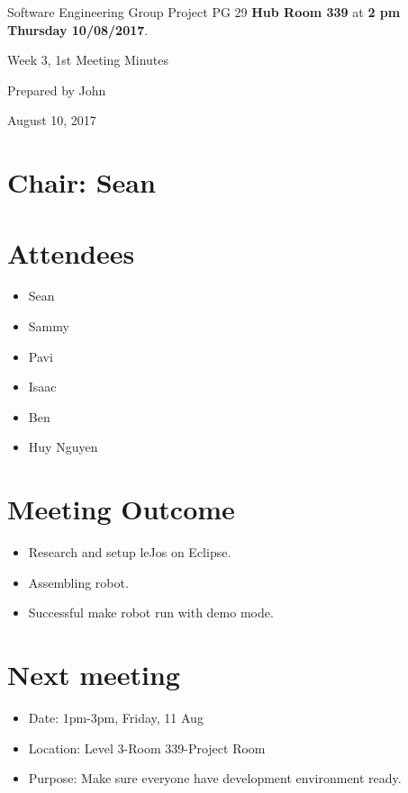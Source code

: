 \documentclass[11pt, a4paper]{article}
\begin{document}
	\noindent Software Engineering Group Project PG 29 {\bf Hub Room 339} at {\bf 2 pm Thursday 10/08/2017}.
	\vspace*{10pt}
	\begin{center}
		\huge Week 3, 1st Meeting Minutes
	\end{center}
	\vspace*{10pt}
	\begin{center}
		\huge Prepared by John
	\end{center}
	\begin{center}
		\huge August 10, 2017
	\end{center}
	\section*{Chair: Sean}
	
	\section{Attendees}
	\begin{itemize}
		\item Sean
		\item Sammy
		\item Pavi
		\item Isaac
		\item Ben
		\item Huy Nguyen
	\end{itemize}
	

	
	\section{Meeting Outcome}
	\begin{itemize}
		\item Research and setup leJos on Eclipse.
		\item Assembling robot.
		\item Successful make robot run with demo mode.
	\end{itemize}
	
	
	
	\section{Next meeting}
	\begin{itemize}
		\item Date: 1pm-3pm, Friday, 11 Aug
		\item Location: Level 3-Room 339-Project Room
		\item Purpose: Make sure everyone have development environment ready.
	\end{itemize}
	
	\vspace*{10pt}
	
\end{document}
